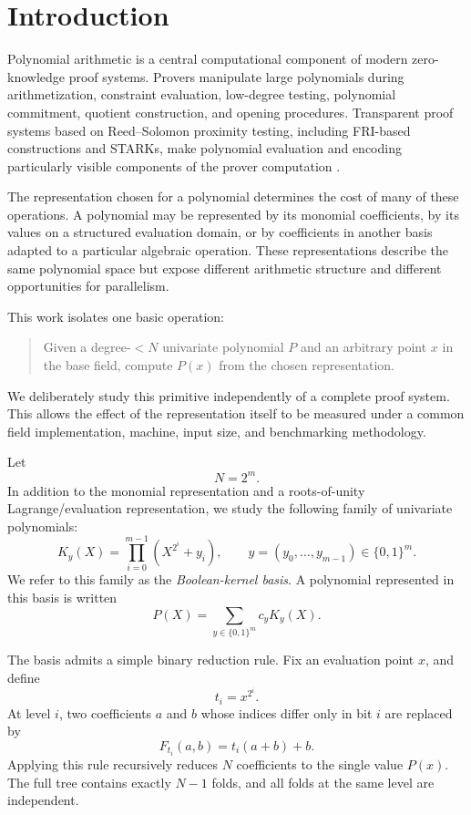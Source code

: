 \section{Introduction}
\label{sec:introduction}

Polynomial arithmetic is a central computational component of modern
zero-knowledge proof systems. Provers manipulate large polynomials during
arithmetization, constraint evaluation, low-degree testing, polynomial
commitment, quotient construction, and opening procedures. Transparent
proof systems based on Reed--Solomon proximity testing, including
FRI-based constructions and STARKs, make polynomial evaluation and encoding
particularly visible components of the prover computation
\cite{stark2018}.

The representation chosen for a polynomial determines the cost of many of
these operations. A polynomial may be represented by its monomial
coefficients, by its values on a structured evaluation domain, or by
coefficients in another basis adapted to a particular algebraic operation.
These representations describe the same polynomial space but expose
different arithmetic structure and different opportunities for
parallelism.

This work isolates one basic operation:
\begin{quote}
Given a degree-\(<N\) univariate polynomial \(P\) and an arbitrary point
\(x\) in the base field, compute \(P(x)\) from the chosen representation.
\end{quote}

We deliberately study this primitive independently of a complete proof
system. This allows the effect of the representation itself to be measured
under a common field implementation, machine, input size, and benchmarking
methodology.

Let
\[
N=2^m.
\]
In addition to the monomial representation and a roots-of-unity
Lagrange/evaluation representation, we study the following family of
univariate polynomials:
\[
K_y(X)
=
\prod_{i=0}^{m-1}
\left(X^{2^i}+y_i\right),
\qquad
y=(y_0,\ldots,y_{m-1})\in\{0,1\}^m.
\]
We refer to this family as the \emph{Boolean-kernel basis}. A polynomial
represented in this basis is written
\[
P(X)
=
\sum_{y\in\{0,1\}^m}
c_y K_y(X).
\]

The basis admits a simple binary reduction rule. Fix an evaluation point
\(x\), and define
\[
t_i=x^{2^i}.
\]
At level \(i\), two coefficients \(a\) and \(b\) whose indices differ only
in bit \(i\) are replaced by
\[
F_{t_i}(a,b)
=
t_i(a+b)+b.
\]
Applying this rule recursively reduces \(N\) coefficients to the single
value \(P(x)\). The full tree contains exactly \(N-1\) folds, and all
folds at the same level are independent.

